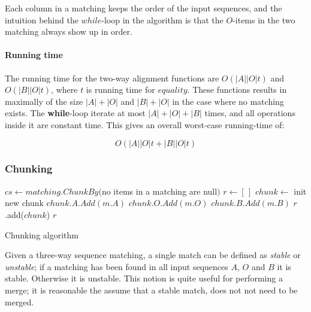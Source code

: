 \documentclass[11pt]{article}
\begin{document}
Each column in a matching keeps the order of the input sequences, and the intuition behind the $while$-loop in the algorithm is that the $O$-items in the two matching always show up in order.

\paragraph{Running time} The running time for the two-way alignment functions are $O(|A||O|t)$ and $O(|B||O|t)$, where $t$ is running time for $equality$. These functions results in maximally of the size $|A|+|O|$ and $|B|+|O|$ in the case where no matching exists. The \textbf{while}-loop iterate at most $|A|+|O|+|B|$ times, and all operations inside it are constant time. This gives an overall worst-case running-time of:

\begin{equation}
	O(|A||O| t + |B||O| t ) \nonumber
\end{equation}  


\subsubsection{Chunking}

\begin{algorithm}
\begin{algorithmic}
	\State $cs \gets matching.ChunkBy($no items in a matching are null$)$
	\State $r \gets [\,]$
		\State $chunk \gets $ init new chunk
				\State $chunk.A.Add(m.A)$
			\EndIf
				\State $chunk.O.Add(m.O)$
			\EndIf
				\State $chunk.B.Add(m.B)$
			\EndIf
		\EndFor
		\State $r$.add($chunk$)
	\EndFor
	\State \Return $r$
\EndFunction
\end{algorithmic}
\caption{Chunking algorithm}
  \label{CunkingAlgorithm}
\end{algorithm}

Given a three-way sequence matching, a single match can be defined as \textit{stable} or \textit{unstable}; if a matching has been found in all input sequences $A$, $O$ and $B$ it is stable. Otherwise it is unstable. This notion is quite useful for performing a merge; it is reasonable the assume that a stable match, does not not need to be merged.
\end{document}
